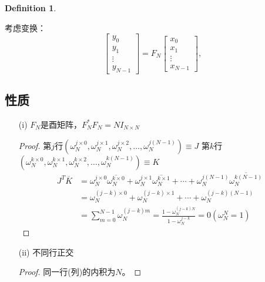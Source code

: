 \documentclass[linespread=1.5,openany]{book}%
\theoremstyle{plain}
\newtheorem{definition}{Definition}
\begin{document}
{{{\begin{definition}
						
					\end{definition}
					考虑变换：\[
					\begin{bmatrix}
						y_0 \\
						y_1 \\
						\vdots \\
						y_{N-1}
					\end{bmatrix}
					= F_N
					\begin{bmatrix}
						x_0 \\
						x_1 \\
						\vdots \\
						x_{N-1}
					\end{bmatrix},\]
					\subsection{性质}
					\begin{itemize}
						\item [(i)]
						$F_N$是酉矩阵，$F_N^* F_N = N I_{N \times N}$
						
						\begin{proof}
							第$j$行$(\omega_N^{j \times 0}, \omega_N^{j \times 1}, \omega_N^{j \times 2}, \ldots, \omega_N^{j(N-1)}) \equiv J$
							第$k$行$(\omega_N^{k \times 0}, \omega_N^{k \times 1}, \omega_N^{k \times 2}, \ldots, \omega_N^{k(N-1)}) \equiv K$
							\begin{equation}
								\begin{aligned}
									J^T \overline{K} &= \omega_N^{j \times 0} \overline{\omega_N^{k \times 0}} + \omega_N^{j \times 1} \overline{\omega_N^{k \times 1}} + \cdots + \omega_N^{j(N-1)} \overline{\omega_N^{k(N-1)}} \\[8pt]
									&= \omega_N^{(j - k) \times 0} + \omega_N^{(j - k) \times 1} + \cdots + \omega_N^{(j - k)(N-1)} \\[8pt]
									&= \sum_{m=0}^{N-1} \omega_N^{(j - k)m} = \frac{1 - \omega_N^{(j - k)N}}{1 - \omega_N^{j - k}} = 0(\omega_N^N = 1)
								\end{aligned}
							\end{equation}
						\end{proof}
						\item [(ii)]不同行正交
						\begin{proof}同一行(列)的内积为$N$。
							

\end{proof}
\end{itemize}}}}
\end{document}

